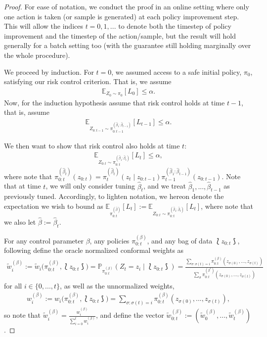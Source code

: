 \begin{proof} \qquad


For ease of notation, we conduct the proof in an online setting where only one action is taken (or sample is generated) at each policy improvement step. This will allow the indices $t=0, 1, ...$ to denote both the timestep of policy improvement and the timestep of the action/sample, but the result will hold generally for a batch setting too (with the guarantee still holding marginally over the whole procedure). 

We proceed by induction. For $t=0$, we assumed access to a safe initial policy, $\pi_0$, satisfying our risk control criterion. That is, we assume
\begin{align*}
    \mathbb{E}_{Z_0\sim \pi_0}[L_0] \leq \alpha.
\end{align*}
Now, for the induction hypothesis assume that risk control holds at time $t-1$, that is, assume
\begin{align*}
    \mathbb{E}_{Z_{0:t-1}\sim \pi_{0:t-1}^{(\hat\beta_1:\hat\beta_{t-1})}}[L_{t-1}] \leq \alpha.
\end{align*}

We then want to show that risk control also holds at time $t$:
\begin{align*}
    \mathbb{E}_{Z_{0:t}\sim \pi_{0:t}^{(\hat\beta_1:\hat\beta_t)}}[L_{t}] \leq \alpha,
\end{align*}
where note that $\pi_{0:t}^{(\hat\beta_t)}(z_{0:t}) = \pi_{t}^{(\hat\beta_t)}(z_t \mid z_{0:t-1})\pi_{t-1}^{(\hat\beta_1:\hat\beta_{t-1})}(z_{0:t-1})$. Note that at time $t$, we will only consider tuning $\hat\beta_t$, and we treat $\hat\beta_1, ..., \hat\beta_{t-1}$ as previously tuned. Accordingly, to lighten notation, we hereon denote the expectation we wish to bound as $\mathbb{E}_{\pi_{0:t}^{(\hat\beta)}}[L_{t}]:=\mathbb{E}_{Z_{0:t}\sim \pi_{0:t}^{(\hat\beta_1:\hat\beta_t)}}[L_{t}]$, where note that we also let $\hat\beta:=\hat\beta_t$.

For any control parameter $\beta$, any policies $\pi_{0:t}^{(\beta)}$, and any bag of data $\lbag z_{0:t}\rbag$, following \citet{tibshirani2019conformal, prinster2024conformal} define the oracle normalized conformal weights as
\begin{align}\label{eq:cp_weights_def_cpc}
    \tilde{w}_i^{(\beta)} := \tilde{w}_i\big(\pi_{0:t}^{(\beta)}, \lbag z_{0:t}\rbag\big) = \mathbb{P}_{\pi_{0:t}^{(\beta)}}(Z_t=z_i \mid \lbag z_{0:t}\rbag) =\frac{\sum_{\sigma:\sigma(t)=i}\pi_{0:t}^{(\beta)}(z_{\sigma(0)}, ..., z_{\sigma(t)})}{\sum_{\sigma}\pi_{0:t}^{(\beta^*)}(z_{\sigma(0)}, ..., z_{\sigma(t)})}
\end{align}
for all $i\in \{0, ..., t\}$, as well as the unnormalized weights,
\begin{align}\label{eq:cp_weights_def_cpc_unnormed}
    w_i^{(\beta)} := w_i\big(\pi_{0:t}^{(\beta)}, \lbag z_{0:t}\rbag\big) = \sum_{\sigma:\sigma(t)=i}\pi_{0:t}^{(\beta)}(z_{\sigma(0)}, ..., z_{\sigma(t)}),
\end{align}
so note that $\tilde{w}_i^{(\beta)} = \frac{w_i^{(\beta)}}{\sum_{i=0}^tw_i^{(\beta)}}$,
and define the vector $\tilde{w}_{0:t}^{(\beta)}:=(\tilde{w}_0^{(\beta)}, ..., \tilde{w}_t^{(\beta)})$.


\end{proof}
